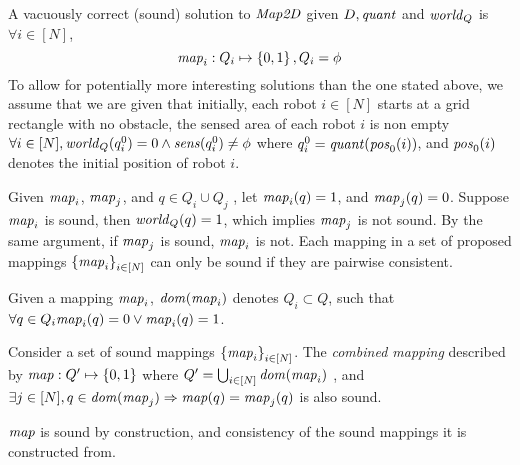 

A vacuously correct (sound) solution to $\mathit{Map2D}$ given $D, \mathit{quant}$ and $\mathit{world}_Q$ is $\forall i \in [N]$, $$\mathit{map}_i : Q_i \mapsto \left\{0,1\right\}, Q_i = \phi$$ To allow for potentially more interesting solutions than the one stated above, we assume that we are given that initially, each robot $i\in[N]$ starts at a grid rectangle with no obstacle, the sensed area of each robot $i$ is non empty
$\forall i \in [N], \mathit{world}_Q(q^0_i) = 0\wedge \mathit{sens}(q^0_i) \neq \phi$
where $q^0_i = \mathit{quant}(\mathit{pos}_0(i))$, and $\mathit{pos}_0(i)$ denotes the initial position of robot $i$.

%

    Given $\mathit{map}_i$, $\mathit{map}_j$, and $q\in Q_i \cup Q_j$ , let $\mathit{map}_i(q) = 1$, and $\mathit{map}_j(q) = 0$. Suppose $\mathit{map}_i$ is sound, then $\mathit{world}_Q(q) = 1$, which implies $\mathit{map}_j$ is not sound. By the same argument, if $\mathit{map}_j$ is sound, $\mathit{map}_i$ is not. Each mapping in a set of proposed mappings $\left\{\mathit{map}_i\right\}_{i\in [N]}$ can only be sound if they are pairwise consistent.

Given a mapping $\mathit{map}_i$, $\mathit{dom}(\mathit{map}_i)$ denotes $ Q_i \subset Q$, such that $\forall q \in Q_i \mathit{map}_i(q) = 0 \vee \mathit{map}_i(q) = 1$.
\begin{definition}
    \label{cons}
Consider a set of sound mappings $\left\{\mathit{map}_i\right\}_{i\in[N]}$. The \emph{ combined mapping} described by $\mathit{map}: Q^\prime \mapsto \left\{0,1\right\}$ where $Q^\prime = \bigcup_{i\in[N]} \mathit{dom}(\mathit{map}_i)$ , and $\exists j \in [N], q\in \mathit{dom}(\mathit{map}_j)\Rightarrow \mathit{map}(q) = \mathit{map}_j(q)$ is also sound.
\end{definition}

$\mathit{map}$ is sound by construction, and consistency of the sound mappings it is constructed from.
